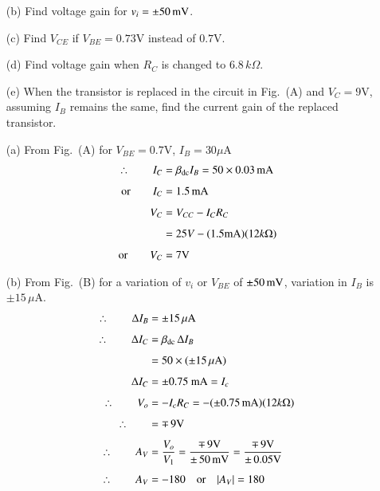 \begin{example}
\begin{itemize}
\item[(b)] Find voltage gain for $v_{i}=\pm 50\text{\,mV}$.

\item[(c)] Find $V_{CE}$ if $V_{BE}=0.73\text{V}$ instead of $0.7\text{V}$.

\item[(d)] Find voltage gain when $R_{C}$ is changed to $6.8\, k\Omega$.

\item[(e)] When the transistor is replaced in the circuit in Fig.~(A) and $V_{C}=9\text{V}$, assuming $I_{B}$ remains the same, find the current gain of the replaced transistor.
\end{itemize}
\end{example}

\begin{solution}
\begin{itemize}
\item[(a)] From Fig.~(A) for $V_{BE}=0.7\text{V}$, $I_{B}=30\mu \text{A}$
\begin{align*}
\therefore\qquad I_{C}&=\beta_{\operatorname{dc}}I_{B}=50\times 0.03\text{\,mA}\\[4pt]
\text{or}\qquad I_{C} &= 1.5\text{\,mA}\\[4pt]
V_{C} &= V_{CC}-I_{C}R_{C}\\[4pt]
&= 25V-(1.5\text{mA})(12k\Omega)\\[4pt]
\text{or}\qquad V_{C} &= 7\text{V}
\end{align*}

\item[(b)] From Fig.~(B) for a variation of $v_{i}$ or $V_{BE}$ of $\pm 50\text{\,mV}$, variation in $I_{B}$ is $\pm 15\,\mu\text{A}$.
\begin{align*}
\therefore\qquad \Delta I_{B} &= \pm 15\,\mu\text{A}\\[4pt]
\therefore\qquad \Delta I_{C} &= \beta_{\operatorname{dc}}\,\Delta I_{B}\\[4pt]
&= 50\times (\pm 15\,\mu\text{A})\\[4pt]
\Delta I_{C} &= \pm 0.75\text{~mA}=I_{c}\\[4pt]
\therefore\qquad V_{o} &= -I_{c}R_{C}=-(\pm 0.75\text{\,mA})(12 k\Omega)\\[4pt]
\therefore\qquad &= \mp\, 9\text{V}\\[4pt]
\therefore\qquad A_{V} &= \frac{V_{o}}{V_{1}}=\dfrac{\mp\,9\text{V}}{\pm\,50\text{\,mV}}=\frac{\mp\,9\text{V}}{\pm\,0.05\text{V}}\\[4pt]
\therefore\qquad A_{V} &= -180\quad\text{or}\quad |A_{V}|=180
\end{align*}


\end{itemize}
\end{solution}
